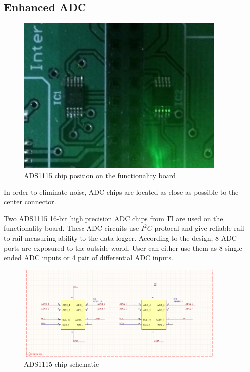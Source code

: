     \subsection{Enhanced ADC}

    \begin{figure}[H]
    \centering
    \includegraphics[width=0.9\textwidth]{adcPosition.png}
    \caption{\label{fig:i2c adcPosition}ADS1115 chip position on the functionality board}
    \end{figure}

    In order to eliminate noise, ADC chips are located as close as possible to the center connector.

    Two ADS1115 16-bit high precision ADC chips from TI are used on the functionality board. These ADC circuits use $I^{2}C$ protocal and give reliable rail-to-rail measuring ability to the data-logger. According to the design, 8 ADC ports are exposured to the outside world. User can either use them as 8 single-ended ADC inputs or 4 pair of differential ADC inputs.

    \begin{figure}[H]
    \centering
    \includegraphics[width=0.9\textwidth]{adcSch.png}
    \caption{\label{fig:i2c schematic}ADS1115 chip schematic}
    \end{figure}

